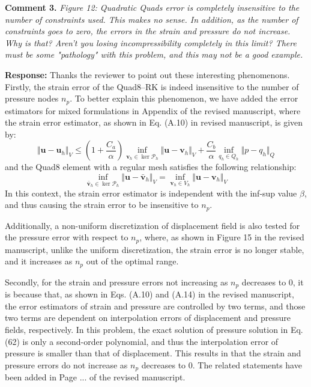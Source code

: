 \documentclass{article}
\begin{document}
\textbf{Comment 3.} \textit{Figure 12: Quadratic Quads error is completely insensitive to the number of constraints used. This makes no sense. In addition, as the number of constraints goes to zero, the errors in the strain and pressure do not increase. Why is that? Aren't you losing incompressibility completely in this limit? There must be some "pathology" with this problem, and this may not be a good example.}

\textbf{Response:} 
Thanks the reviewer to point out these interesting phenomenons.
Firstly,
the strain error of the Quad8--RK is indeed insensitive to the number of pressure nodes $n_p$.
To better explain this phenomenon, we have added the error estimators for mixed formulations in Appendix of the revised manuscript,
where the strain error estimator, as shown in Eq. (A.10) in revised manuscript, is given by:
\begin{equation}\label{u_estimator}
\Vert \boldsymbol u - \boldsymbol u_h \Vert_V \le (1+\frac{C_a}{\alpha}) \inf_{\boldsymbol v_h \in \ker \mathcal P_h} \Vert \boldsymbol u - \boldsymbol v_h \Vert_V + \frac{C_b}{\alpha} \inf_{q_h \in Q_h} \Vert p - q_h \Vert_Q
\end{equation}
and the Quad8 element with a regular mesh satisfies the following relationship:
\begin{equation}\label{interp_error_0}
\inf_{\bar{\boldsymbol v}_h \in \ker \mathcal P_h} \Vert \boldsymbol u - \bar{\boldsymbol v}_h \Vert_V = \inf_{\boldsymbol v_h \in V_h} \Vert \boldsymbol u - \boldsymbol v_h \Vert_V
\end{equation}
In this context, the strain error estimator is independent with the inf-sup value $\beta$, and thus causing the strain error to be insensitive to $n_p$.

Additionally, a non-uniform discretization of displacement field is also tested for the pressure error with respect to $n_p$, where, as shown in Figure 15 in the revised manuscript, unlike the uniform discretization, the strain error is no longer stable, and it increases as $n_p$ out of the optimal range.

Secondly, for the strain and pressure errors not increasing as $n_p$ decreases to 0,
it is because that, as shown in Eqs. (A.10) and (A.14) in the revised manuscript, the error estimators of strain and pressure are controlled by two terms, and those two terms are dependent on interpolation errors of displacement and pressure fields, respectively.
In this problem, the exact solution of pressure solution in Eq.(62) is only a second-order polynomial, and thus the interpolation error of pressure is smaller than that of displacement.
This results in that the strain and pressure errors do not increase as $n_p$ decreases to 0.
The related statements have been added in Page ... of the revised manuscript.
\end{document}
